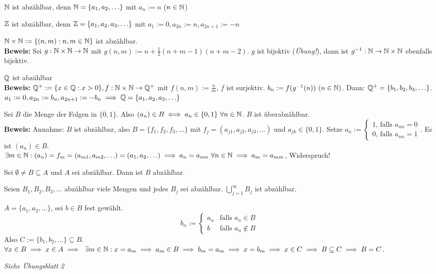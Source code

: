 \documentclass[a4paper,twoside,DIV15,BCOR12mm]{scrbook}
\begin{document}
\begin{beispiele}
\item $\mathbb{N}$ ist abzählbar, denn $\mathbb{N} = \{a_1,a_2,\ldots\}$ mit $a_n := n$ ($n\in \mathbb{N}$)
\item $\mathbb{Z}$ ist abzählbar, denn $\mathbb{Z} = \{a_1,a_2,a_3,\ldots\}$ mit $a_1:= 0, a_{2n} := n, a_{2n+1} := -n$
\item $\mathbb{N}\times\mathbb{N} := \{(n,m): n,m \in \mathbb{N}\}$ ist abzählbar.\\
\textbf{Beweis:} Sei $g: \mathbb{N}\times\mathbb{N} \rightarrow \mathbb{N}$ mit $g(n,m) := n+\frac{1}{2}(n+m-1)(n+m-2)$. $g$ ist bijektiv (\textit{Übung!}), dann ist $g^{-1}: \mathbb{N} \rightarrow \mathbb{N}\times\mathbb{N}$ ebenfalls bijektiv.
\item $\mathbb{Q}$ ist abzählbar\\
\textbf{Beweis:} $\mathbb{Q}^+ := \{x \in \mathbb{Q}: x>0\}, f:\mathbb{N}\times\mathbb{N} \rightarrow \mathbb{Q}^+$ mit $f(n,m) := \frac{n}{m}$, $f$ ist surjektiv. $b_n := f(g^{-1}(n))\ (n\in\MdN)$. Dann: $\mathbb{Q}^+ = \{b_1, b_2, b_3,\ldots\}$. $a_1:= 0, a_{2n} := b_n, a_{2n+1} := -b_n \implies \mathbb{Q} = \{a_1,a_2,a_3,\ldots\}$
\item Sei $B$ die Menge der Folgen in $\{0,1\}$. Also $(a_n)\in B \equizu a_n \in \{0,1\} \ \forall n \in \MdN$. $B$ ist überabzählbar.\\
\textbf{Beweis:} Annahme: $B$ ist abzählbar, also $B=\{f_1,f_2,f_3,\ldots\}$ mit $f_j = (a_{j1}, a_{j2}, a_{j3},\ldots)$ und $a_{jk} \in \{0,1\}$. Setze $a_n := \begin{cases}1\mbox{, falls } a_{nn} = 0 \\ 0\mbox{, falls }a_{nn} = 1\end{cases}$. Es ist $(a_n) \in B$. \\
$\exists m \in \mathbb{N}: (a_n) = f_m = (a_{m1}, a_{m2}, \ldots) = (a_1,a_2,\ldots) \implies a_n = a_{mn}\ \forall n \in \mathbb{N} \implies a_m = a_{mm}$, Widerspruch!
\end{beispiele}

\begin{satz*}
\begin{liste}
\item Sei $\emptyset \ne B \subseteq A$ und $A$ sei abzählbar. Dann ist $B$ abzählbar.
\item Seien $B_1, B_2, B_3, \ldots$ abzählbar viele Mengen und jedes $B_j$ sei abzählbar. $\displaystyle \bigcup_{j=1}^\infty B_j$ ist abzählbar.
\end{liste}
\end{satz*}

\begin{beweise}
\item $A = \{a_1,a_2,\ldots\}$, sei $b \in B$ fest gewählt.
$$ b_n := \begin{cases} a_n & \mbox{falls } a_n \in B \\ b & \mbox{falls } a_n \notin B \end{cases}$$
Also $C:=\{b_1,b_2,\ldots\} \subseteq B$. $\forall x \in B \folgt x \in A \folgt \ \exists m \in \MdN: x = a_m \folgt a_m \in B \folgt b_m = a_m \folgt x=b_m \folgt x \in C \folgt B \subseteq C \folgt B = C$.
\item \textit{Siehe Übungsblatt 2}
\end{beweise}
\end{document}
